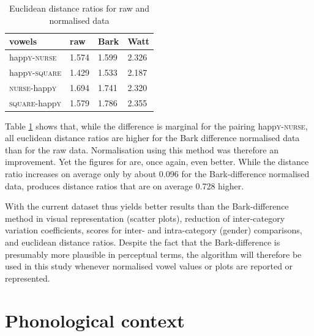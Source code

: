 \begin{table}[h]
	\centering
	\caption{Euclidean distance ratios for raw and normalised data}
	\begin{tabular}{llll}
		\hline
		vowels & raw & Bark & Watt\\
		\hline
		happ\textsc{y}-\textsc{nurse} &
		1.574 &
		1.599 &
		2.326 \\
		happ\textsc{y}-\textsc{square} &
		1.429 &
		1.533 &
		2.187 \\
		\textsc{nurse}-happ\textsc{y} &
		1.694 &
		1.741 &
		2.320 \\
		\textsc{square}-happ\textsc{y} &
		1.579 &
		1.786 &
		2.355 \\
		\hline
	\end{tabular}
	\label{tab.euclid}
\end{table}

Table \ref{tab.euclid} shows that, while the difference is marginal for the pairing happ\textsc{y}-\textsc{nurse}, all euclidean distance ratios are higher for the Bark difference normalised data than for the raw data.
Normalisation using this method was therefore an improvement.
Yet the figures for \citeauthor{wattfabricius2002} are, once again, even better.
While the distance ratio increases on average only by about 0.096 for the Bark-difference normalised data, \citeauthor{wattfabricius2002} produces distance ratios that are on average 0.728 higher.

With the current dataset \citeauthor{wattfabricius2002} thus yields better results than the Bark-difference method in visual representation (scatter plots), reduction of inter-category variation coefficients,  scores for inter- and intra-category (gender) comparisons, and euclidean distance ratios.
Despite the fact that the Bark-difference  is presumably more plausible in perceptual terms, the \citeauthor{wattfabricius2002} algorithm will therefore be used in this study whenever normalised vowel values or plots are reported or represented.

\section{Phonological context}
\label{sec.prod_method.phon}

